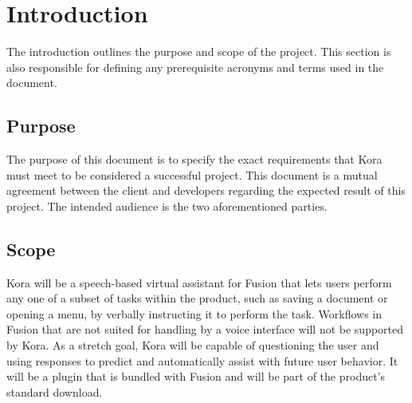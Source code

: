 \documentclass[onecolumn, draftclsnofoot,10pt, compsoc]{IEEEtran}
\def \botname{Kora\xspace}
\begin{document}
\begin{titlepage}
\begin{singlespace}
{{            }
            \vspace{20pt}
        }
        \begin{abstract}
       		This document outlines the technical requirements that \botname must meet before the 2018 OSU Engineering Expo. 
            It starts with an overall description of the project and follows with specific functional and performance requirements.
            At the end, there is a Gantt chart which gives a timeline detailing when each major requirement will be completed.
        \end{abstract}     
    \end{singlespace}
\end{titlepage}
\newpage
{}
\tableofcontents
\clearpage

\section{Introduction}
        The introduction outlines the purpose and scope of the project. 
        This section is also responsible for defining any prerequisite acronyms and terms used in the document. 
    \subsection{Purpose}
        The purpose of this document is to specify the exact requirements that \botname must meet to be considered a successful project. 
        This document is a mutual agreement between the client and developers regarding the expected result of this project.
        The intended audience is the two aforementioned parties.
    \subsection{Scope}
        \botname will be a speech-based virtual assistant for Fusion that lets users perform any one of a subset of tasks within the product, such as saving a document or opening a menu, by verbally instructing it to perform the task.
        Workflows in Fusion that are not suited for handling by a voice interface will not be supported by \botname.
        As a stretch goal, \botname will be capable of questioning the user and using responses to predict and automatically assist with future user behavior.
        It will be a plugin that is bundled with Fusion and will be part of the product's standard download. \\
\end{document}
